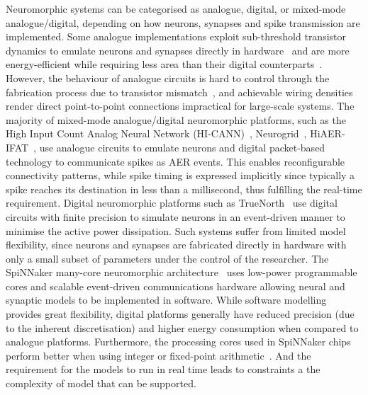 Neuromorphic systems can be categorised as analogue, digital, or mixed-mode analogue/digital, depending on how neurons, synapses and spike transmission are implemented. %
Some analogue implementations exploit sub-threshold transistor dynamics to emulate neurons and synapses directly in hardware~\cite{indiveri2011neuromorphic} and are more energy-efficient while requiring less area than their digital counterparts~\cite{joubert2012hardware}. However, the behaviour of analogue circuits is hard to control through the fabrication process due to transistor mismatch~\cite{indiveri2011neuromorphic,pedram2006thermal,linares2003compact}, and achievable wiring densities render direct point-to-point connections impractical for large-scale systems. The majority of mixed-mode analogue/digital neuromorphic platforms, such as the High Input Count Analog Neural Network (HI-CANN)~\cite{schemmel2010wafer}, Neurogrid~\cite{benjamin2014neurogrid}, HiAER-IFAT~\cite{yu201265k}, use analogue circuits to emulate neurons and digital packet-based technology to communicate spikes as AER events. This enables reconfigurable connectivity patterns, while spike timing is expressed implicitly since typically a spike reaches its destination in less than a millisecond, thus fulfilling the real-time requirement. Digital neuromorphic platforms such as TrueNorth~\cite{merolla2014million} use digital circuits with finite precision to simulate neurons in an event-driven manner to minimise the active power dissipation. Such systems suffer from limited model flexibility, since neurons and synapses are fabricated directly in hardware with only a small subset of parameters under the control of the researcher. 
The SpiNNaker many-core neuromorphic architecture~\cite{furber2014spinnaker} uses low-power programmable cores and scalable event-driven communications hardware allowing neural and synaptic models to be implemented in software.
While software modelling provides great flexibility, digital platforms generally have reduced precision (due to the inherent discretisation) and higher energy consumption when compared to analogue platforms. Furthermore, the processing cores used in SpiNNaker chips perform better when using integer or fixed-point arithmetic~\cite{Hopkins2015Accuracy}.
And the requirement for the models to run in real time leads to constraints a the complexity of model that can be supported.

